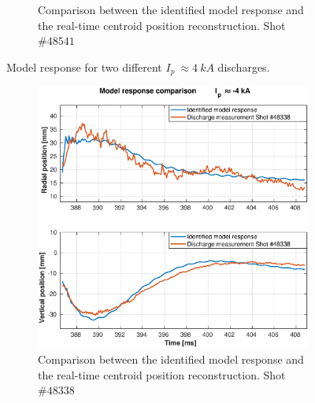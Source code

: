 \begin{figure}
\begin{subfigure}[b]{0.55\textwidth}
		\caption{ Comparison between the  identified model response and the real-time centroid position reconstruction. Shot $\#48541 $ \label{SimResp541}}
	\end{subfigure}
	\caption{Model response for two different  $I_p~\approx 4~kA$ discharges. \label{SimResp_pos}}
\end{figure}


\begin{figure}
	\begin{subfigure}[b]{0.55\textwidth}
		\includegraphics[width=\textwidth]{Chp5/SimResp_338.eps}  
		\caption{Comparison between the  identified model response and the real-time centroid position reconstruction. Shot $\#48338 $ \label{SimResp338} }
	\end{subfigure}
	~ %
	\begin{subfigure}[b]{0.55\textwidth}

\end{subfigure}
\end{figure}
